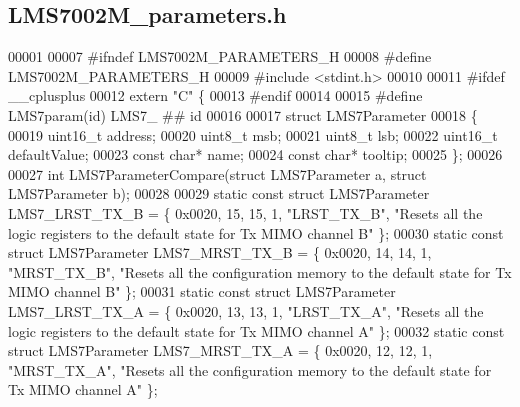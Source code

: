 \subsection{L\+M\+S7002\+M\+\_\+parameters.\+h}
\label{LMS7002M__parameters_8h_source}

\begin{DoxyCode}
00001 
00007 \textcolor{preprocessor}{#ifndef LMS7002M\_PARAMETERS\_H}
00008 \textcolor{preprocessor}{#define LMS7002M\_PARAMETERS\_H}
00009 \textcolor{preprocessor}{#include <stdint.h>}
00010 
00011 \textcolor{preprocessor}{#ifdef \_\_cplusplus}
00012 \textcolor{keyword}{extern} \textcolor{stringliteral}{"C"} \{
00013 \textcolor{preprocessor}{#endif}
00014 
00015 \textcolor{preprocessor}{#define LMS7param(id) LMS7\_ ## id}
00016 
00017 \textcolor{keyword}{struct }LMS7Parameter
00018 \{
00019     uint16\_t address;
00020     uint8\_t msb;
00021     uint8\_t lsb;
00022     uint16\_t defaultValue;
00023     \textcolor{keyword}{const} \textcolor{keywordtype}{char}* name;
00024     \textcolor{keyword}{const} \textcolor{keywordtype}{char}* tooltip;
00025 \};
00026 
00027 \textcolor{keywordtype}{int} LMS7ParameterCompare(\textcolor{keyword}{struct} LMS7Parameter a, \textcolor{keyword}{struct} LMS7Parameter b);
00028 
00029 \textcolor{keyword}{static} \textcolor{keyword}{const} \textcolor{keyword}{struct }LMS7Parameter LMS7_LRST_TX_B = \{ 0x0020, 15, 15, 1, \textcolor{stringliteral}{"LRST\_TX\_B"}, \textcolor{stringliteral}{"Resets all the logic
       registers to the default state for Tx MIMO channel B"} \};
00030 \textcolor{keyword}{static} \textcolor{keyword}{const} \textcolor{keyword}{struct }LMS7Parameter LMS7_MRST_TX_B = \{ 0x0020, 14, 14, 1, \textcolor{stringliteral}{"MRST\_TX\_B"}, \textcolor{stringliteral}{"Resets all the
       configuration memory to the default state for Tx MIMO channel B"} \};
00031 \textcolor{keyword}{static} \textcolor{keyword}{const} \textcolor{keyword}{struct }LMS7Parameter LMS7_LRST_TX_A = \{ 0x0020, 13, 13, 1, \textcolor{stringliteral}{"LRST\_TX\_A"}, \textcolor{stringliteral}{"Resets all the logic
       registers to the default state for Tx MIMO channel A"} \};
00032 \textcolor{keyword}{static} \textcolor{keyword}{const} \textcolor{keyword}{struct }LMS7Parameter LMS7_MRST_TX_A = \{ 0x0020, 12, 12, 1, \textcolor{stringliteral}{"MRST\_TX\_A"}, \textcolor{stringliteral}{"Resets all the
       configuration memory to the default state for Tx MIMO channel A"} \};

\end{DoxyCode}
